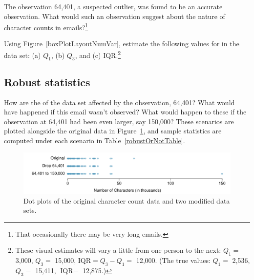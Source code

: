 \begin{exercise}
The observation 64,401, a suspected outlier, was found to be an accurate observation. What would such an observation suggest about the nature of character counts in emails?\footnote{That occasionally there may be very long emails.}\end{exercise}

\begin{exercise}
Using Figure~\ref{boxPlotLayoutNumVar}, estimate the following values for  in the  data set: (a) $Q_1$, (b) $Q_3$, and (c) IQR.\footnote{These visual estimates will vary a little from one person to the next: $Q_1=$ 3,000, $Q_3=$ 15,000, $\text{IQR}=Q_3 - Q_1 = $ 12,000. (The true values: $Q_1=$ 2,536, $Q_3=$ 15,411, $\text{IQR} = $ 12,875.)}
\end{exercise}



\subsection{Robust statistics}

How are the  of the  data set affected by the observation, 64,401? What would have happened if this email wasn't observed? What would happen to these  if the observation at 64,401 had been even larger, say 150,000? These scenarios are plotted alongside the original data in Figure~\ref{email50NumCharDotPlotRobustEx}, and sample statistics are computed under each scenario in Table~\ref{robustOrNotTable}.

\begin{figure}[ht]
\centering
\includegraphics[width=\textwidth]{ch_intro_to_data/figures/email50NumCharDotPlotRobustEx/email50NumCharDotPlotRobustEx}
\caption{Dot plots of the original character count data and two modified data sets.}
\label{email50NumCharDotPlotRobustEx}
\end{figure}

